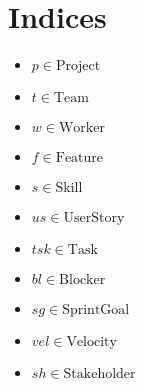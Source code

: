 \documentclass[11pt]{article}
\begin{document}
\section{Indices}
\begin{itemize}
    \item $p \in \text{Project}$
    \item $t \in \text{Team}$
    \item $w \in \text{Worker}$
    \item $f \in \text{Feature}$
    \item $s \in \text{Skill}$
    \item $us \in \text{UserStory}$
    \item $tsk \in \text{Task}$
    \item $bl \in \text{Blocker}$
    \item $sg \in \text{SprintGoal}$
    \item $vel \in \text{Velocity}$
    \item $sh \in \text{Stakeholder}$
\end{itemize}
\end{document}
